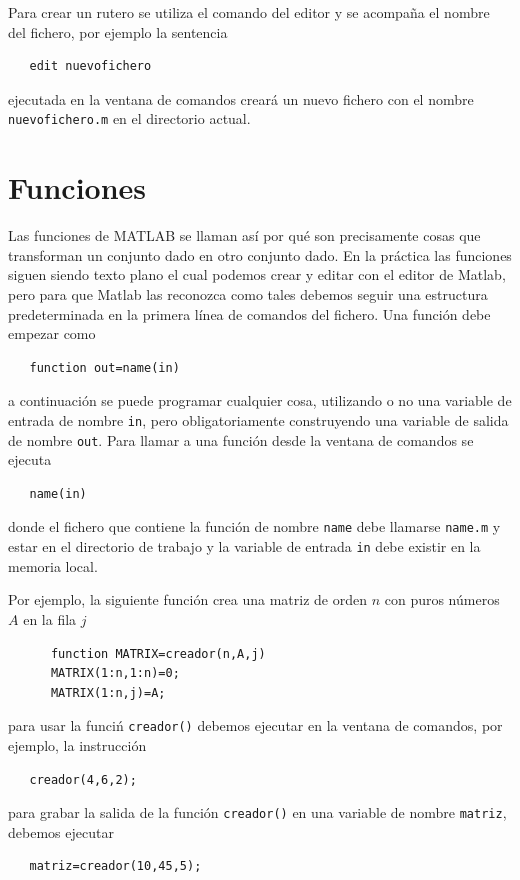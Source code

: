 \documentclass[11pt]{article}
\begin{document}
Para crear un rutero se utiliza el comando del editor y se acompaña el nombre del fichero, por ejemplo la sentencia 
  \begin{verbatim}
   edit nuevofichero
  \end{verbatim}
ejecutada en la ventana de comandos crear\'a un nuevo fichero con el nombre \texttt{nuevofichero.m} en el directorio actual.

\section{Funciones}
  Las funciones de MATLAB se llaman as\'i por qu\'e son precisamente cosas que transforman un conjunto dado en otro conjunto dado. En la pr\'actica las funciones siguen siendo texto plano el cual podemos crear y editar con el editor de Matlab, pero para que Matlab las reconozca como tales debemos seguir una estructura predeterminada en la primera l\'inea de comandos del fichero. Una funci\'on debe empezar como
  \begin{verbatim}
   function out=name(in)
  \end{verbatim}
  a continuaci\'on se puede programar cualquier cosa, utilizando o no una variable de entrada de nombre \texttt{in}, pero obligatoriamente construyendo una variable de salida de nombre \texttt{out}. Para llamar a una funci\'on desde la ventana de comandos se ejecuta
  \begin{verbatim}
   name(in)
  \end{verbatim}
  donde el fichero que contiene la funci\'on de nombre \texttt{name} debe llamarse \texttt{name.m} y estar en el directorio de trabajo y la variable de entrada \texttt{in} debe existir en la memoria local.
  
Por ejemplo, la siguiente funci\'on crea una matriz de orden $n$ con puros n\'umeros $A$ en la fila $j$
  \begin{verbatim}
      function MATRIX=creador(n,A,j)
      MATRIX(1:n,1:n)=0;
      MATRIX(1:n,j)=A;
  \end{verbatim}
  para usar la funci\'n \texttt{creador()} debemos ejecutar en la ventana de comandos, por ejemplo, la instrucci\'on
  \begin{verbatim}
   creador(4,6,2);
  \end{verbatim}
  para grabar la salida de la funci\'on \texttt{creador()} en una variable de nombre \texttt{matriz}, debemos ejecutar
  \begin{verbatim}
   matriz=creador(10,45,5);
  \end{verbatim}
\end{document}
